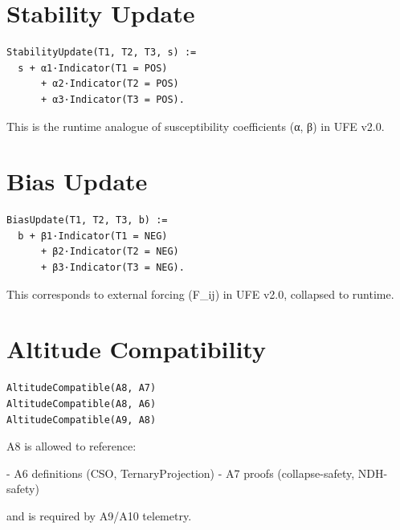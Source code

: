 \documentclass[11pt]{article}
\begin{document}
\section{Stability Update}

\begin{verbatim}
StabilityUpdate(T1, T2, T3, s) :=
  s + α1·Indicator(T1 = POS)
      + α2·Indicator(T2 = POS)
      + α3·Indicator(T3 = POS).
\end{verbatim}

This is the runtime analogue of susceptibility coefficients (α, β) in UFE v2.0.

\newpage


\section{Bias Update}

\begin{verbatim}
BiasUpdate(T1, T2, T3, b) :=
  b + β1·Indicator(T1 = NEG)
      + β2·Indicator(T2 = NEG)
      + β3·Indicator(T3 = NEG).
\end{verbatim}

This corresponds to external forcing (F_{ij}) in UFE v2.0, collapsed to runtime.

\newpage


\section{Altitude Compatibility}

\begin{verbatim}
AltitudeCompatible(A8, A7)
AltitudeCompatible(A8, A6)
AltitudeCompatible(A9, A8)
\end{verbatim}

A8 is allowed to reference:

- A6 definitions (CSO, TernaryProjection)
- A7 proofs (collapse-safety, NDH-safety)

and is required by A9/A10 telemetry.

\newpage

\end{document}
